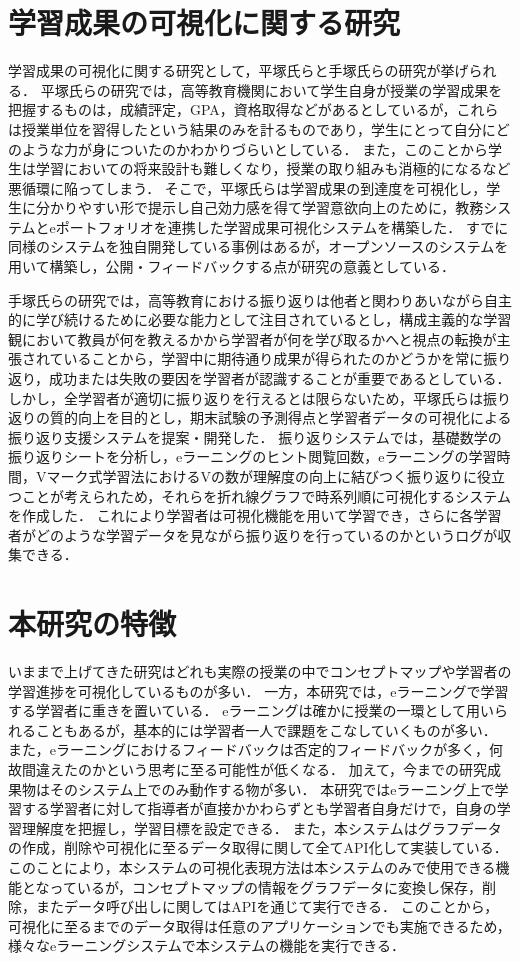 \section{学習成果の可視化に関する研究}\label{sec:kasika_ref}
学習成果の可視化に関する研究として，平塚氏ら\cite{hira}と手塚氏ら\cite{teduka}の研究が挙げられる．
平塚氏らの研究では，高等教育機関において学生自身が授業の学習成果を把握するものは，成績評定，GPA，資格取得などがあるとしているが，これらは授業単位を習得したという結果のみを計るものであり，学生にとって自分にどのような力が身についたのかわかりづらいとしている．
また，このことから学生は学習においての将来設計も難しくなり，授業の取り組みも消極的になるなど悪循環に陥ってしまう．
そこで，平塚氏らは学習成果の到達度を可視化し，学生に分かりやすい形で提示し自己効力感を得て学習意欲向上のために，教務システムとeポートフォリオを連携した学習成果可視化システムを構築した．
すでに同様のシステムを独自開発している事例はあるが，オープンソースのシステムを用いて構築し，公開・フィードバックする点が研究の意義としている．

手塚氏らの研究では，高等教育における振り返りは他者と関わりあいながら自主的に学び続けるために必要な能力として注目されているとし，構成主義的な学習観において教員が何を教えるかから学習者が何を学び取るかへと視点の転換が主張されていることから，学習中に期待通り成果が得られたのかどうかを常に振り返り，成功または失敗の要因を学習者が認識することが重要であるとしている．
しかし，全学習者が適切に振り返りを行えるとは限らないため，平塚氏らは振り返りの質的向上を目的とし，期末試験の予測得点と学習者データの可視化による振り返り支援システムを提案・開発した．
振り返りシステムでは，基礎数学の振り返りシートを分析し，eラーニングのヒント閲覧回数，eラーニングの学習時間，Vマーク式学習法におけるVの数が理解度の向上に結びつく振り返りに役立つことが考えられため，それらを折れ線グラフで時系列順に可視化するシステムを作成した．
これにより学習者は可視化機能を用いて学習でき，さらに各学習者がどのような学習データを見ながら振り返りを行っているのかというログが収集できる．

\section{本研究の特徴}\label{sec:my_thesis}
いままで上げてきた研究はどれも実際の授業の中でコンセプトマップや学習者の学習進捗を可視化しているものが多い．
一方，本研究では，eラーニングで学習する学習者に重きを置いている．
eラーニングは確かに授業の一環として用いられることもあるが，基本的には学習者一人で課題をこなしていくものが多い．
また，eラーニングにおけるフィードバックは否定的フィードバックが多く，何故間違えたのかという思考に至る可能性が低くなる．
加えて，今までの研究成果物はそのシステム上でのみ動作する物が多い．
本研究ではeラーニング上で学習する学習者に対して指導者が直接かかわらずとも学習者自身だけで，自身の学習理解度を把握し，学習目標を設定できる．
また，本システムはグラフデータの作成，削除や可視化に至るデータ取得に関して全てAPI化して実装している．
このことにより，本システムの可視化表現方法は本システムのみで使用できる機能となっているが，コンセプトマップの情報をグラフデータに変換し保存，削除，またデータ呼び出しに関してはAPIを通じて実行できる．
このことから，可視化に至るまでのデータ取得は任意のアプリケーションでも実施できるため，様々なeラーニングシステムで本システムの機能を実行できる．


